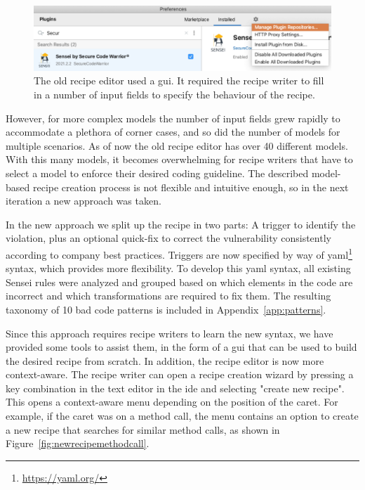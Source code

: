 \begin{figure}
  \centering
  \includegraphics[width=\textwidth,page=7]{04-tools/figures/figures2.pdf}
  \caption[Old model-based recipe editor]{The old recipe editor used a \gls{gui}. It required the recipe writer to fill in a number of input fields to specify the behaviour of the recipe.}
  \label{fig:recipeedit2} 
\end{figure}

However, for more complex models the number of input fields grew rapidly to accommodate a plethora of corner cases, and so did the number of models for multiple scenarios.
As of now the old recipe editor has over 40 different models.
With this many models, it becomes overwhelming for recipe writers that have to select a model to enforce their desired coding guideline.
The described model-based recipe creation process is not flexible and intuitive enough, so in the next iteration a new approach was taken.

In the new approach we split up the recipe in two parts: A trigger to identify the violation, plus an optional quick-fix to correct the vulnerability consistently according to company best practices.
Triggers are now specified by way of \gls{yaml}\footnote{\url{https://yaml.org/}} syntax, which provides more flexibility.
To develop this \gls{yaml} syntax, all existing Sensei rules were analyzed and grouped based on which elements in the code are incorrect and which transformations are required to fix them.
The resulting taxonomy of 10 bad code patterns is included in Appendix~\ref{app:patterns}.

Since this approach requires recipe writers to learn the new syntax, we have provided some tools to assist them, in the form of a \gls{gui} that can be used to build the desired recipe from scratch.
In addition, the recipe editor is now more context-aware.
The recipe writer can open a recipe creation wizard by pressing a key combination in the text editor in the \gls{ide} and selecting "create new recipe".
This opens a context-aware menu depending on the position of the caret.
For example, if the caret was on a method call, the menu contains an option to create a new recipe that searches for similar method calls, as shown in Figure~\ref{fig:newrecipemethodcall}.

